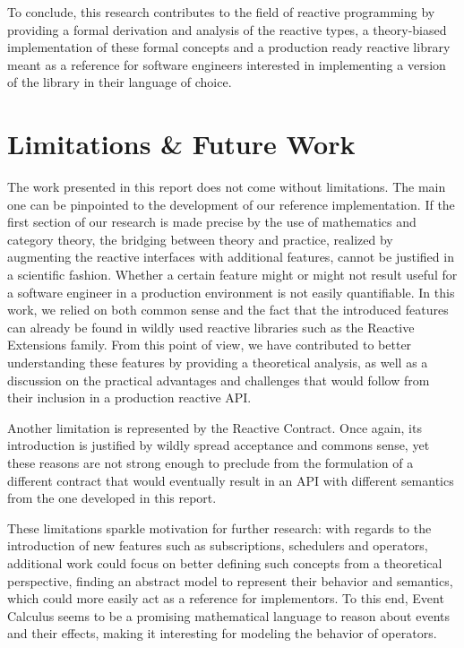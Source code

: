 To conclude, this research contributes to the field of reactive programming by providing a formal derivation and analysis of the reactive types, a theory-biased implementation of these formal concepts and a production ready reactive library meant as a reference for software engineers interested in implementing a version of the library in their language of choice.

\section*{Limitations \& Future Work}
\label{future-work}


The work presented in this report does not come without limitations. The main one can be pinpointed to the development of our reference implementation. If the first section of our research is made precise by the use of mathematics and category theory, the bridging between theory and practice, realized by augmenting the reactive interfaces with additional features, cannot be justified in a scientific fashion. Whether a certain feature might or might not result useful for a software engineer in a production environment is not easily quantifiable. In this work, we relied on both common sense and the fact that the introduced features can already be found in wildly used reactive libraries such as the Reactive Extensions family. From this point of view, we have contributed to better understanding these features by providing a theoretical analysis, as well as a discussion on the practical advantages and challenges that would follow from their inclusion in a production reactive API. 

Another limitation is represented by the Reactive Contract. Once again, its introduction is justified by wildly spread acceptance and commons sense, yet these reasons are not strong enough to preclude from the formulation of a different contract that would eventually result in an API with different semantics from the one developed in this report. 

These limitations sparkle motivation for further research: with regards to the introduction of new features such as subscriptions, schedulers and operators, additional work could focus on better defining such concepts from a theoretical perspective, finding an abstract model to represent their behavior and semantics, which could more easily act as a reference for implementors. To this end, Event Calculus\cite{shanahan1999event} seems to be a promising mathematical language to reason about events and their effects, making it interesting for modeling the behavior of operators.

